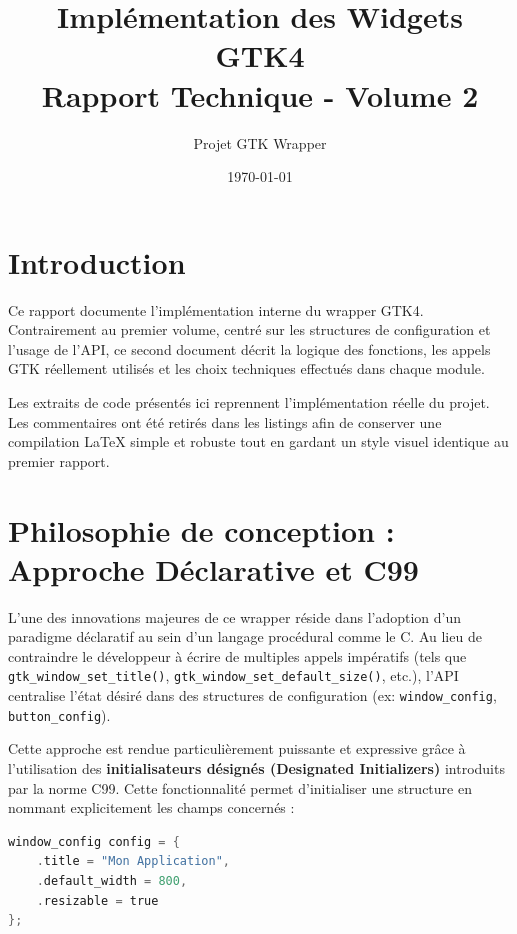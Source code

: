 \documentclass[12pt,a4paper]{article}
\title{Implémentation des Widgets GTK4 \\ Rapport Technique - Volume 2}
\author{Projet GTK Wrapper}
\date{\today}
\begin{document}
\maketitle

\tableofcontents

\newpage

\section{Introduction}
Ce rapport documente l'implémentation interne du wrapper GTK4. Contrairement au premier volume, centré sur les structures de configuration et l'usage de l'API, ce second document décrit la logique des fonctions, les appels GTK réellement utilisés et les choix techniques effectués dans chaque module.

Les extraits de code présentés ici reprennent l'implémentation réelle du projet. Les commentaires ont été retirés dans les listings afin de conserver une compilation LaTeX simple et robuste tout en gardant un style visuel identique au premier rapport.

\section{Philosophie de conception : Approche Déclarative et C99}

L'une des innovations majeures de ce wrapper réside dans l'adoption d'un paradigme déclaratif au sein d'un langage procédural comme le C. Au lieu de contraindre le développeur à écrire de multiples appels impératifs (tels que \texttt{gtk\_window\_set\_title()}, \texttt{gtk\_window\_set\_default\_size()}, etc.), l'API centralise l'état désiré dans des structures de configuration (ex: \texttt{window\_config}, \texttt{button\_config}).

Cette approche est rendue particulièrement puissante et expressive grâce à l'utilisation des \textbf{initialisateurs désignés (Designated Initializers)} introduits par la norme C99. Cette fonctionnalité permet d'initialiser une structure en nommant explicitement les champs concernés :

\begin{lstlisting}[language=C]
window_config config = {
    .title = "Mon Application",
    .default_width = 800,
    .resizable = true
};
\end{lstlisting}
\end{document}
